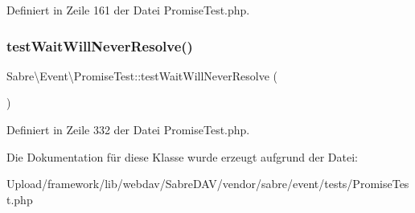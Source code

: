 Definiert in Zeile 161 der Datei Promise\+Test.\+php.

\mbox{\label{class_sabre_1_1_event_1_1_promise_test_a2627863ab45ae6cd7a1d5ce03acb7858}} 
\subsubsection{\texorpdfstring{test\+Wait\+Will\+Never\+Resolve()}{testWaitWillNeverResolve()}}
{\footnotesize\ttfamily Sabre\textbackslash{}\+Event\textbackslash{}\+Promise\+Test\+::test\+Wait\+Will\+Never\+Resolve (\begin{DoxyParamCaption}{ }\end{DoxyParamCaption})}



Definiert in Zeile 332 der Datei Promise\+Test.\+php.



Die Dokumentation für diese Klasse wurde erzeugt aufgrund der Datei\+:\begin{DoxyCompactItemize}
\item 
Upload/framework/lib/webdav/\+Sabre\+D\+A\+V/vendor/sabre/event/tests/Promise\+Test.\+php\end{DoxyCompactItemize}
